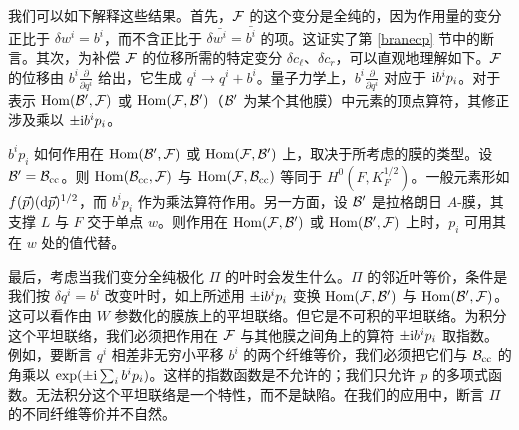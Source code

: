 我们可以如下解释这些结果。首先，${\mathcal F}$ 的这个变分是全纯的，因为作用量的变分正比于 $\delta w^i=b^i$，而不含正比于 $\delta\bar{w^i}=\bar{b^i}$ 的项。这证实了第 \ref{branecp} 节中的断言。其次，为补偿 ${\mathcal F}$ 的位移所需的特定变分 $\delta c_\ell$、$\delta c_r$，可以直观地理解如下。${\mathcal F}$ 的位移由 $b^i\frac{\partial}{\partial q^i}$ 给出，它生成 $q^i\to q^i+b^i$。量子力学上，$b^i\frac{\partial}{\partial q^i}$ 对应于 ${\mathrm i} b^i p_i$。对于表示 ${\mathrm{Hom}}({\mathcal B}',{\mathcal F})$ 或 ${\mathrm{Hom}}({\mathcal F},{\mathcal B}')$（${\mathcal B}'$ 为某个其他膜）中元素的顶点算符，其修正涉及乘以 $\pm{\mathrm i} b^i p_i$。

$b^i p_i$ 如何作用在 ${\mathrm{Hom}}({\mathcal B}',{\mathcal F})$ 或 ${\mathrm{Hom}}({\mathcal F},{\mathcal B}')$ 上，取决于所考虑的膜的类型。设 ${\mathcal B}'={\mathcal B}_{\mathrm{cc}}$。则 ${\mathrm{Hom}}({\mathcal B}_{\mathrm{cc}},{\mathcal F})$ 与 ${\mathrm{Hom}}({\mathcal F},{\mathcal B}_{\mathrm{cc}})$ 等同于 $H^0(F,K_F^{1/2})$。一般元素形如 $f(\vec p)({\mathrm d}\vec p)^{1/2}$，而 $b^i p_i$ 作为乘法算符作用。另一方面，设 ${\mathcal B}'$ 是拉格朗日 $A$-膜，其支撑 $L$ 与 $F$ 交于单点 $w$。则作用在 ${\mathrm{Hom}}({\mathcal F},{\mathcal B}')$ 或 ${\mathrm{Hom}}({\mathcal B}',{\mathcal F})$ 上时，$p_i$ 可用其在 $w$ 处的值代替。

最后，考虑当我们变分全纯极化 $\varPi$ 的叶时会发生什么。$\varPi$ 的邻近叶等价，条件是我们按 $\delta q^i=b^i$ 改变叶时，如上所述用 $\pm{\mathrm i} b^i p_i$ 变换 ${\mathrm{Hom}}({\mathcal F},{\mathcal B}')$ 与 ${\mathrm{Hom}}({\mathcal B}',{\mathcal F})$。这可以看作由 $W$ 参数化的膜族上的平坦联络。但它是不可积的平坦联络。为积分这个平坦联络，我们必须把作用在 ${\mathcal F}$ 与其他膜之间角上的算符 $\pm{\mathrm i} b^i p_i$ 取指数。例如，要断言 $q^i$ 相差非无穷小平移 $b^i$ 的两个纤维等价，我们必须把它们与 ${\mathcal B}_{\mathrm{cc}}$ 的角乘以 $\exp(\pm{\mathrm i}\sum_i b^i p_i)$。这样的指数函数是不允许的；我们只允许 $p$ 的多项式函数。无法积分这个平坦联络是一个特性，而不是缺陷。在我们的应用中，断言 $\varPi$ 的不同纤维等价并不自然。

